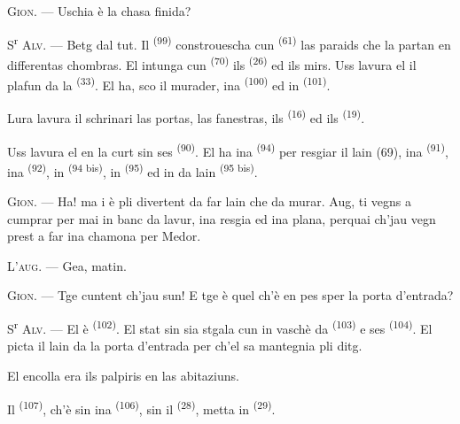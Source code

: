 \textsc{Gion}. --- Uschia è la chasa finida?

\VUsaut{3.0mm}
\VUsaut{3.0mm}

S\textsuperscript{r} \textsc{Alv}. --- Betg dal tut. Il 
\textsuperscript{(99)} constrouescha cun  \textsuperscript{(61)} las
paraids che la partan en differentas chombras. El intunga cun 
\textsuperscript{(70)} ils  \textsuperscript{(26)} ed ils mirs. Uss
lavura el il plafun da la  \textsuperscript{(33)}. El ha, sco il
murader, ina  \textsuperscript{(100)} ed in 
\textsuperscript{(101)}.

Lura lavura il schrinari las portas, las fanestras, ils 
\textsuperscript{(16)} ed ils  \textsuperscript{(19)}.

Uss lavura el en la curt sin ses  \textsuperscript{(90)}. El ha
ina  \textsuperscript{(94)} per resgiar il lain (69), ina
 \textsuperscript{(91)}, ina  \textsuperscript{(92)}, in
 \textsuperscript{(94 bis)}, in 
\textsuperscript{(95)} ed in  da lain \textsuperscript{(95 bis)}.

\textsc{Gion}. --- Ha! ma i è pli divertent da far lain che da murar. Aug, ti vegns
a cumprar per mai in banc da lavur, ina resgia ed ina plana, perquai ch'jau vegn
prest a far ina chamona per Medor.

\textsc{L'aug}. --- Gea, matin.

\textsc{Gion}. --- Tge cuntent ch'jau sun! E tge è quel ch'è en pes sper la porta
d'entrada?

\VUsaut{3.0mm}
\VUsaut{3.0mm}

S\textsuperscript{r} \textsc{Alv}. --- El è  \textsuperscript{(102)}. El
stat sin sia stgala cun in vaschè da  \textsuperscript{(103)} e ses
 \textsuperscript{(104)}. El picta il lain da la porta d'entrada per
ch'el sa mantegnia pli ditg.

El encolla era ils palpiris en las abitaziuns.

Il  \textsuperscript{(107)}, ch'è sin ina 
\textsuperscript{(106)}, sin il  \textsuperscript{(28)}, metta in
 \textsuperscript{(29)}.

